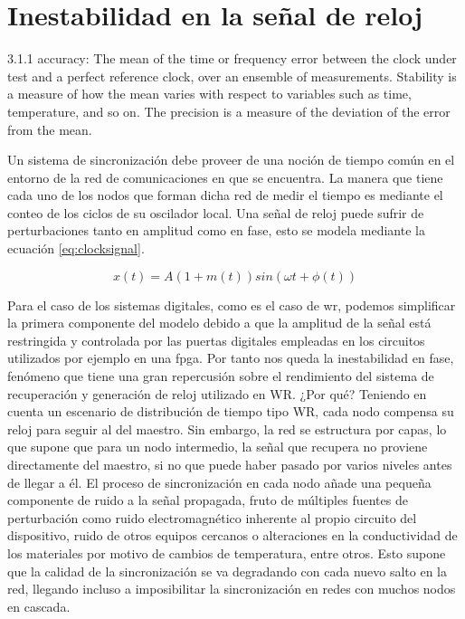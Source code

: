 \chapter{Inestabilidad en la señal de reloj}


3.1.1 accuracy: The mean of the time or frequency error between the clock under 
test and a perfect
reference clock, over an ensemble of measurements. Stability is a measure of 
how the mean varies with
respect to variables such as time, temperature, and so on. The precision is a 
measure of the deviation of the
error from the mean.

Un sistema de sincronización debe proveer de una noción de tiempo común en el 
entorno de la red de comunicaciones en que se encuentra. La manera que tiene 
cada uno de los nodos que forman dicha red de medir el tiempo es mediante el 
conteo de los ciclos de su oscilador local. Una señal de reloj puede sufrir de 
perturbaciones tanto en amplitud como en fase, esto se modela mediante la 
ecuación \ref*{eq:clocksignal}.

\begin{equation}\label{eq:clocksignal}
x(t) = A(1+m(t))sin(\omega t + \phi (t))
\end{equation}

Para el caso de los sistemas digitales, como es el caso de \gls{wr}, podemos 
simplificar la primera componente del modelo debido a que la amplitud de la 
señal está restringida y controlada por las puertas digitales empleadas en los 
circuitos utilizados por ejemplo en una \gls{fpga}. Por tanto nos queda la 
inestabilidad en fase, fenómeno que tiene una gran repercusión sobre el 
rendimiento del sistema de recuperación y generación de reloj utilizado en WR. 
¿Por qué? Teniendo en cuenta un escenario de distribución de tiempo tipo WR, 
cada nodo compensa su reloj para seguir al del maestro. Sin embargo, la red se 
estructura por capas, lo que supone que para un nodo intermedio, la señal que 
recupera no proviene directamente del maestro, si no que puede haber pasado por 
varios niveles antes de llegar a él. El proceso de sincronización en cada nodo 
añade una pequeña componente de ruido a la señal propagada, fruto de múltiples 
fuentes de perturbación como ruido electromagnético inherente al propio 
circuito del dispositivo, ruido de otros equipos cercanos o alteraciones en la 
conductividad de los materiales por motivo de cambios de temperatura, entre 
otros. Esto supone que la calidad de la sincronización se va degradando con 
cada nuevo salto en la red, llegando incluso a imposibilitar la sincronización 
en redes con muchos nodos en cascada.

